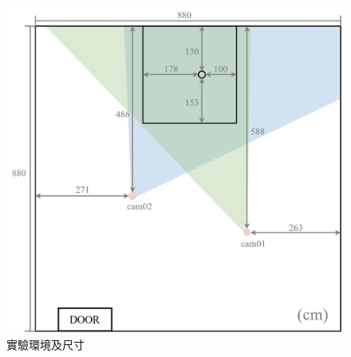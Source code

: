 \begin{figure}[!ht]
   \centering
   \includegraphics[width=\linewidth]{figure/ch3_fig_indoor_scale.png}
    \caption[實驗環境及尺寸]{實驗環境及尺寸}
    \label{ch3_fig_indoor_scale}
\end{figure}

